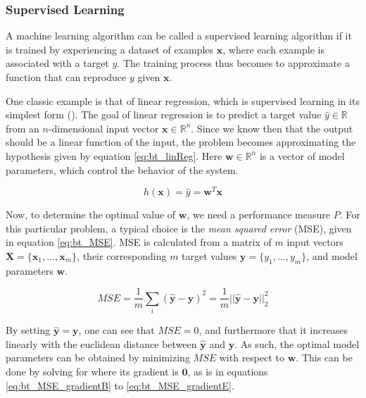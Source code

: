 \subsubsection{Supervised Learning}

A machine learning algorithm can be called a supervised learning algorithm if it is trained by experiencing a dataset of examples $\mathbf{x}$, where each example is associated with a target $y$. The training process thus becomes to approximate a function that can reproduce $y$ given $\mathbf{x}$.

One classic example is that of linear regression, which is supervised learning in its simplest form (\cite{goodfellow2016}). The goal of linear regression is to predict a target value $\hat{y}\in\mathbb{R}$ from an $n$-dimensional input vector $\mathbf{x}\in\mathbb{R}^n$. Since we know then that the output should be a linear function of the input, the problem becomes approximating the hypothesis given by equation \ref{eq:bt_linReg}. Here $\mathbf{w}\in\mathbb{R}^n$ is a vector of model parameters, which control the behavior of the system.

\begin{equation}
    \label{eq:bt_linReg}
    h(\mathbf{x})=\hat{y}=\mathbf{w}^T\mathbf{x}
\end{equation}

Now, to determine the optimal value of $\mathbf{w}$, we need a performance measure $P$. For this particular problem, a typical choice is the \textit{mean squared error} (MSE), given in equation \ref{eq:bt_MSE}. MSE is calculated from a matrix of $m$ input vectors $\mathbf{X}=\{\mathbf{x}_1,\dots,\mathbf{x}_m\}$, their corresponding $m$ target values $\mathbf{y}=\{y_1,\dots,y_m\}$, and model parameters $\mathbf{w}$.

\begin{equation}
    \label{eq:bt_MSE}
    MSE=\frac{1}{m}\sum_{i}(\hat{\mathbf{y}}-\mathbf{y})^2
    =\frac{1}{m}||\hat{\mathbf{y}}-\mathbf{y}||^2_2
\end{equation}

By setting $\hat{\mathbf{y}}=\mathbf{y}$, one can see that $MSE=0$, and furthermore that it increases linearly with the euclidean distance between $\hat{\mathbf{y}}$ and $\mathbf{y}$. As such, the optimal model parameters can be obtained by minimizing $MSE$ with respect to $\mathbf{w}$. This can be done by solving for where its gradient is $\mathbf{0}$, as is in equations \ref{eq:bt_MSE_gradientB} to \ref{eq:bt_MSE_gradientE}.

